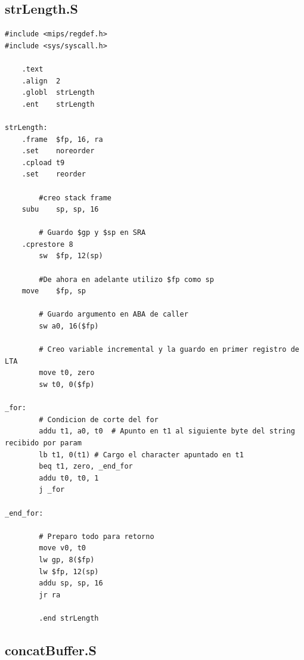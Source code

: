 \documentclass[a4paper,11pt]{article}
\begin{document}
\subsection{strLength.S}

\lstset{language=[x86masm]Assembler, breaklines=true, basicstyle=\normalsize}
\begin{lstlisting}
#include <mips/regdef.h>
#include <sys/syscall.h>

	.text
	.align	2
	.globl	strLength
	.ent	strLength

strLength:
	.frame	$fp, 16, ra
	.set	noreorder
	.cpload	t9
	.set	reorder
        
        #creo stack frame
	subu	sp, sp, 16

        # Guardo $gp y $sp en SRA
	.cprestore 8
        sw	$fp, 12(sp)
        
        #De ahora en adelante utilizo $fp como sp
	move	$fp, sp

        # Guardo argumento en ABA de caller
        sw a0, 16($fp)

        # Creo variable incremental y la guardo en primer registro de LTA
        move t0, zero
        sw t0, 0($fp)

_for:
        # Condicion de corte del for
        addu t1, a0, t0  # Apunto en t1 al siguiente byte del string recibido por param
        lb t1, 0(t1) # Cargo el character apuntado en t1
        beq t1, zero, _end_for
        addu t0, t0, 1
        j _for

_end_for:
        
        # Preparo todo para retorno
        move v0, t0
        lw gp, 8($fp)
        lw $fp, 12(sp)
        addu sp, sp, 16
        jr ra

        .end strLength
\end{lstlisting}

\subsection{concatBuffer.S}
\end{document}
